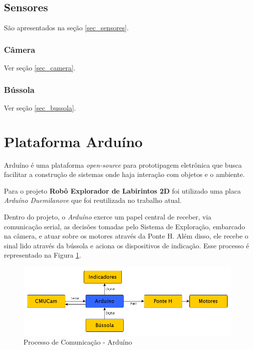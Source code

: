 \subsection{Sensores}

São apresentados na seção \ref{sec_sensores}.

\subsubsection{Câmera}

Ver seção \ref{sec_camera}.

\subsubsection{Bússola}

Ver seção \ref{sec_bussola}.

\section{Plataforma Arduíno}
\label{sec_arduino}

Arduíno é uma plataforma \textit{open-source} para prototipagem eletrônica que busca facilitar a construção de sistemas onde haja interação com objetos e o ambiente. \cite{arduino1}

Para o projeto \textbf{Robô Explorador de Labirintos 2D} foi utilizado uma placa \textit{Arduíno Duemilanove} que foi reutilizada no trabalho atual.

Dentro do projeto, o \textit{Arduíno} exerce um papel central de receber, via comunicação serial, as decisões tomadas pelo Sistema de Exploração, embarcado na câmera, e atuar sobre os motores através da Ponte H. Além disso, ele recebe o sinal lido através da bússola e aciona os dispositivos de indicação. Esse processo é representado na Figura \ref{int_fig02}.

\begin{figure}[h!]
    \center
    \includegraphics[scale=0.5]{imagens/processo_arduino.png}
    \caption{Processo de Comunicação - Arduíno}
    \label{int_fig02}
\end{figure}

